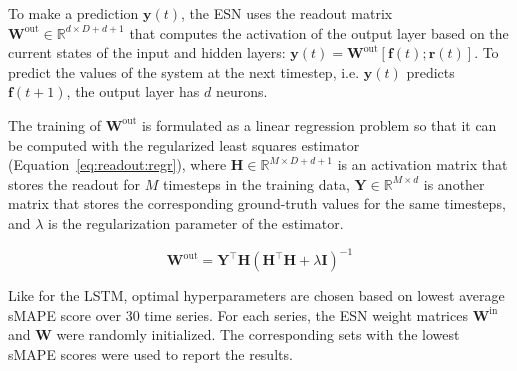 To make a prediction $\mathbf{y}(t)$, the ESN uses the readout matrix $\mathbf{W}^{\mathrm{out}} \in \mathbb{R}^{d  \times D+d+1}$ that computes the activation of the output layer based on the current states of the input and hidden layers: 
$\mathbf{y}(t) = \mathbf{W}^{\mathrm{out}} [\mathbf{f}(t); \mathbf{r}(t)]$. 
To predict the values of the system at the next timestep, i.e. $\mathbf{y}(t)$ predicts $\mathbf{f}(t+1)$, the output layer has $d$ neurons. 

The training of $\mathbf{W}^{\mathrm{out}}$ is formulated as a linear regression problem so that it can be computed with the regularized least squares estimator (Equation~\ref{eq:readout:regr}), where $\mathbf{H} \in \mathbb{R}^{M \times D+d+1}$ is an activation matrix that stores the readout for $M$ timesteps in the training data, $\mathbf{Y} \in \mathbb{R}^{M \times d}$ is another matrix that stores the corresponding ground-truth values for the same timesteps, and $\lambda$ is the regularization parameter of the estimator.

\begin{equation}
\mathbf{W}^{\mathrm{out}}= \mathbf{Y}^{\top} \mathbf{H} \left( \mathbf{H}^{\top} \mathbf{H} + \lambda \mathbf{I}\right)^{-1}
\label{eq:readout:regr}
\end{equation}

Like for the LSTM, optimal hyperparameters are chosen based on lowest average sMAPE score over 30 time series. For each series, the ESN weight matrices $\mathbf{W}^{\mathrm{in}}$ and  $\mathbf{W}$ were randomly initialized. The corresponding sets with the lowest sMAPE scores were used to report the results.


